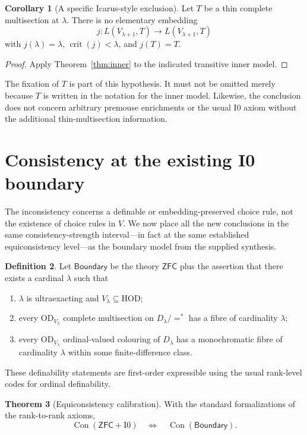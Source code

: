 \documentclass[11pt,letterpaper]{article}
\theoremstyle{definition}
\newtheorem{definition}{Definition}[section]
\newtheorem{theorem}[definition]{Theorem}
\newtheorem{corollary}[definition]{Corollary}
\numberwithin{equation}{section}
\newcommand{\ZFC}{\mathsf{ZFC}}
\newcommand{\HOD}{\mathrm{HOD}}
\newcommand{\OD}{\mathrm{OD}}
\newcommand{\Con}{\operatorname{Con}}
\newcommand{\crit}{\operatorname{crit}}
\newcommand{\Izero}{\mathrm{I0}}
\newcommand{\eqfin}{\mathrel{=^{*}}}
\newcommand{\Boundary}{\mathsf{Boundary}}
\begin{document}
\begin{corollary}[A specific Icarus-style exclusion]\label{cor:icarus}
Let $T$ be a thin complete multisection at $\lambda$. There is no elementary embedding
\[
 j:L(V_{\lambda+1},T)\longrightarrow L(V_{\lambda+1},T)
\]
with $j(\lambda)=\lambda$, $\crit(j)<\lambda$, and $j(T)=T$.
\end{corollary}

\begin{proof}
Apply Theorem~\ref{thm:inner} to the indicated transitive inner model.
\end{proof}

The fixation of $T$ is part of this hypothesis. It must not be omitted merely because $T$ is written in the notation for the inner model. Likewise, the conclusion does not concern arbitrary premouse enrichments or the usual $\Izero$ axiom without the additional thin-multisection information.

\section{Consistency at the existing I0 boundary}\label{sec:consistency}

The inconsistency concerns a definable or embedding-preserved choice rule, not the existence of choice rules in $V$. We now place all the new conclusions in the same consistency-strength interval---in fact at the same established equiconsistency level---as the boundary model from the supplied synthesis.

\begin{definition}\label{def:boundary}
Let $\Boundary$ be the theory $\ZFC$ plus the assertion that there exists a cardinal $\lambda$ such that
\begin{enumerate}
\item $\lambda$ is ultraexacting and $V_\lambda\subseteq\HOD$;
\item every $\OD_{V_\lambda}$ complete multisection on $D_\lambda/{\eqfin}$ has a fibre of cardinality $\lambda$;
\item every $\OD_{V_\lambda}$ ordinal-valued colouring of $D_\lambda$ has a monochromatic fibre of cardinality $\lambda$ within some finite-difference class.
\end{enumerate}
These definability statements are first-order expressible using the usual rank-level codes for ordinal definability.
\end{definition}

\begin{theorem}[Equiconsistency calibration]\label{thm:cons}
With the standard formalizations of the rank-to-rank axioms,
\[
 \Con(\ZFC+\Izero)\quad\Longleftrightarrow\quad\Con(\Boundary).
\]
\end{theorem}
\end{document}
